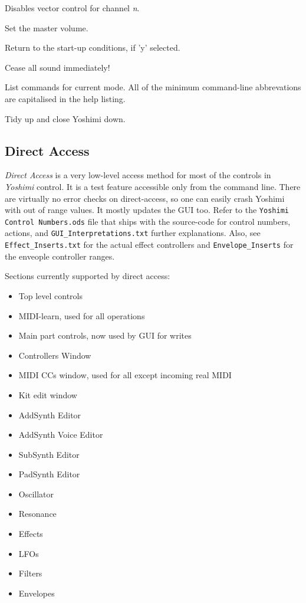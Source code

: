       Disables vector control for channel \textsl{n}.

      Set the master volume.

      Return to the start-up conditions, if 'y' selected.

      Cease all sound immediately!

      List commands for current mode.  All of the minimum command-line
      abbrevations are capitalised in the help listing.

         Tidy up and close Yoshimi down.

\subsection{Direct Access}
\label{subsec:command_line_direct_access}

   \textsl{Direct Access} is a very low-level access method for most of the
   controls in \textsl{Yoshimi} control.
   It is a test feature accessible only from the command line.
   There are virtually no error checks on direct-access, so one can easily
   crash Yoshimi with out of range values.
   It mostly updates the GUI too.
   Refer to the \texttt{Yoshimi Control Numbers.ods} file that ships with the
   source-code
   for control numbers, actions, and \texttt{GUI\_Interpretations.txt}
   further explanations.
   Also, see \texttt{Effect\_Inserts.txt} for the actual effect controllers and
   \texttt{Envelope\_Inserts} for the enveople controller ranges.

   Sections currently supported by direct access:

   \begin{itemize}
      \item Top level controls
      \item MIDI-learn, used for all operations
      \item Main part controls, now used by GUI for writes
      \item Controllers Window
      \item MIDI CCs window, used for all except incoming real MIDI
      \item Kit edit window
      \item AddSynth Editor
      \item AddSynth Voice Editor
      \item SubSynth Editor
      \item PadSynth Editor
      \item Oscillator
      \item Resonance
      \item Effects
      \item LFOs
      \item Filters
      \item Envelopes
   \end{itemize}

